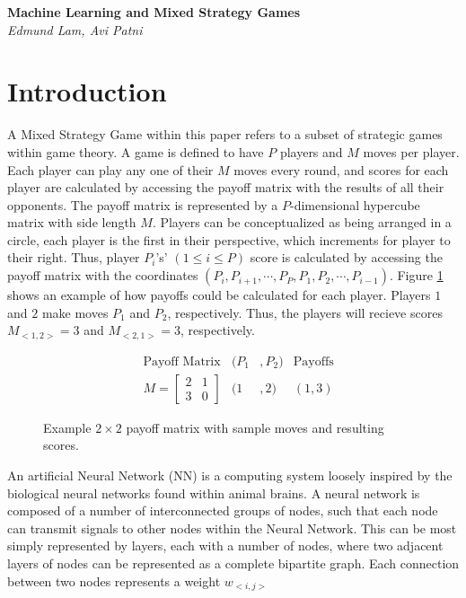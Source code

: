 \documentclass{article}
\begin{document}
\begin{titlepage}
	\begin{center}
		\Large\textbf{Machine Learning and Mixed Strategy Games}\\
		\large\textit{Edmund Lam, Avi Patni}
	\end{center}
\end{titlepage}

\section{Introduction}

A Mixed Strategy Game within this paper refers to a subset of strategic games within game theory. A game is defined to have $P$ players and $M$ moves per player. Each player can play any one of their $M$ moves every round, and scores for each player are calculated by accessing the payoff matrix with the results of all their opponents. The payoff matrix is represented by a $P$-dimensional hypercube matrix with side length $M$. Players can be conceptualized as being arranged in a circle, each player is the first in their perspective, which increments for player to their right. Thus, player $P_i$'s' $(1\leq i\leq P)$ score is calculated by accessing the payoff matrix with the coordinates $(P_i, P_{i+1}, \cdots , P_P, P_1, P_2, \cdots , P_{i-1})$. Figure \ref{fig:1} shows an example of how payoffs could be calculated for each player. Players $1$ and $2$ make moves $P_1$ and $P_2$, respectively. Thus, the players will recieve scores $M_{<1,2>}=3$ and $M_{<2,1>}=3$, respectively.

\begin{figure}[h]
  \caption{Example $2\times2$ payoff matrix with sample moves and resulting scores.}
  	\begin{align*}
  	&\text{Payoff Matrix} &(P_1&,P_2) &\text{Payoffs}\\
	  &M=
	  \begin{bmatrix}
		  2 & 1\\
		  3 & 0
	  \end{bmatrix}
	  &(1&,2)
	  &(1,3)
	  \end{align*}
  \label{fig:1}
\end{figure}

An artificial Neural Network (NN) is a computing system loosely inspired by the biological neural networks found within animal brains. A neural network is composed of a number of interconnected groups of nodes, such that each node can transmit signals to other nodes within the Neural Network. This can be most simply represented by layers, each with a number of nodes, where two adjacent layers of nodes can be represented as a complete bipartite graph. Each connection between two nodes represents a weight $w_{<i,j>}$
\end{document}
